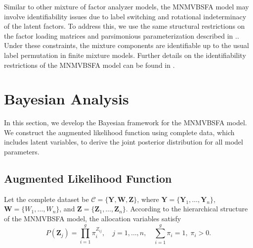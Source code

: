 \documentclass[twoside]{article}
\theoremstyle{definition}
\begin{document}
Similar to other mixture of factor analyzer models, the MNMVBSFA model may involve identifiability issues due to label switching and rotational indeterminacy of the latent factors. To address this, we use the same structural restrictions on the factor loading matrices and parsimonious parameterization described in \cite{Hashemi:2024}.. Under these constraints, the mixture components are identifiable up to the usual label permutation in finite mixture models. Further details on the identifiability restrictions of the MNMVBSFA model can be found in \cite{Hashemi:2024}.

\section{Bayesian Analysis}
\vspace{-0.5cm}
In this section, we develop the Bayesian framework for the MNMVBSFA model. We construct the augmented likelihood function using complete data, which includes latent variables, to derive the joint posterior distribution for all model parameters.

\subsection{Augmented Likelihood Function}
\vspace{-0.5cm}
Let the complete dataset be $\mathcal{C} = \{\bm Y, \bm W, \bm Z\}$, where $\bm Y = \{\bm Y_1, \dots, \bm Y_n\}$, $\bm W = \{W_1, \dots, W_n\}$, and $\bm Z = \{\bm Z_1, \dots, \bm Z_n\}$. According to the hierarchical structure of the MNMVBSFA model, the allocation variables satisfy
\[
P(\bm Z_j) = \prod_{i=1}^g \pi_i^{Z_{ij}}, \quad j=1,\dots,n, \quad \sum_{i=1}^g \pi_i = 1, \;\pi_i>0.
\]
\end{document}
